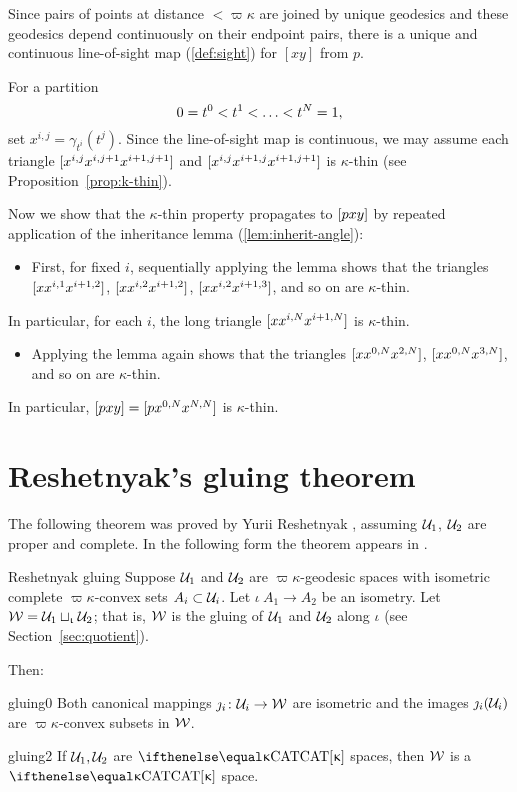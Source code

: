 Since pairs of points at distance $<\varpi\kappa$ are joined by unique geodesics and these geodesics depend continuously on their endpoint pairs, there is a unique and continuous line-of-sight map (\ref{def:sight}) for  $[x y]$ from $p$.    

For a partition \[0\z=t^0\z<t^1\z<\z\dots\z<t^N=1,\] 
set $x^{i,j}=\gamma_{t^i}(t^j)$. 
Since the line-of-sight map is continuous, we may assume each triangle $[{x^{i,j}}{x^{i,j+1}}{x^{i+1,j+1}}]$ and $[{x^{i,j}}{x^{i+1,j}}{x^{i+1,j+1}}]$ is $\kappa$-thin 
(see Proposition~\ref{prop:k-thin}).

Now we show that the $\kappa$-thin property propagates to $[{p}{x}{y}]$ by repeated application of the inheritance lemma (\ref{lem:inherit-angle}):
\begin{itemize}
\item 
First, for fixed $i$, 
sequentially applying the lemma shows  that the triangles 
$[{x}{x^{i,1}}{x^{i+1,2}}]$, 
$[{x}{x^{i,2}}{x^{i+1,2}}]$, 
$[{x}{x^{i,2}}{x^{i+1,3}}]$,
and so on are $\kappa$-thin. 
\end{itemize}
In particular, for each $i$, the long triangle $[{x}{x^{i,N}}{x^{i+1,N}}]$ is $\kappa$-thin.
\begin{itemize} 
\item 
Applying the lemma again shows that the  triangles $[{x}{x^{0,N}}{x^{2,N}}]$, $[{x}{x^{0,N}}{x^{3,N}}]$, and so on are $\kappa$-thin. 
\end{itemize}
In particular, $[{p}{x}{y}]=[{p}{x^{0,N}}{x^{N,N}}]$ is $\kappa$-thin.
\qeds

\section{Reshetnyak's gluing theorem}\label{sec:cba-gluing}

The following theorem was proved by Yurii Reshetnyak \cite{reshetnyak:glue}, assuming $\mathcal{U}_1$, $\mathcal{U}_2$ are proper and complete.  In the following form the theorem appears in \cite{BH}.

\begin{thm}{Reshetnyak gluing}\label{thm:gluing}
Suppose 
$\mathcal{U}_1$ and $\mathcal{U}_2$ are %
$\varpi\kappa$-geodesic spaces 
with isometric complete $\varpi\kappa$-convex sets $A_i\subset\spc{U}_i$.  Let $\iota\:A_1\to A_2$ be an isometry.
Let $\mathcal{W}=\mathcal{U}_1\sqcup_{\upiota}\mathcal{U}_2$;
that is, $\mathcal{W}$ is the gluing of $\mathcal{U}_1$ and  $\mathcal{U}_2$ along $\iota$ (see Section~\ref{sec:quotient}).

Then: 
\begin{subthm}{gluing0}
Both canonical mappings $\jmath_i\:\spc{U}_i\to\spc{W}$ are isometric 
and the images $\jmath_i(\mathcal{U}_i)$ are $\varpi\kappa$-convex subsets in $\mathcal{W}$.
\end{subthm}

\begin{subthm}{gluing2}
If $\mathcal{U}_1, \mathcal{U}_2$ are $\CAT\kappa$ spaces,
then $\mathcal{W}$ is a $\CAT\kappa$ space.
\end{subthm} 
\end{thm}

